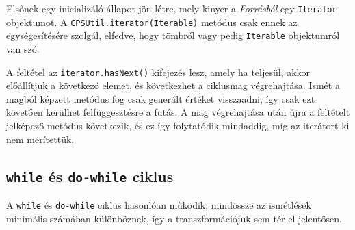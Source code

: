 Elsőnek egy inicializáló állapot jön létre, mely kinyer a \textit{Forrásból} egy \texttt{Iterator} objektumot. A \texttt{CPSUtil.iterator(Iterable)} metódus csak ennek az egységesítésére szolgál, elfedve, hogy tömbről vagy pedig \texttt{Iterable} objektumról van szó. 

A feltétel az \texttt{iterator.hasNext()} kifejezés lesz, amely ha teljesül, akkor előállítjuk a következő elemet, és következhet a ciklusmag végrehajtása. Ismét a magból képzett metódus fog csak generált értéket visszaadni, így csak ezt követően kerülhet felfüggesztésre a futás. A mag végrehajtása után újra a feltételt jelképező metódus következik, és ez így folytatódik mindaddig, míg az iterátort ki nem merítettük.

\subsection{\texttt{while} és \texttt{do-while} ciklus}

A \texttt{while} és \texttt{do-while} ciklus hasonlóan működik, mindössze az ismétlések minimális számában különböznek, így a transzformációjuk sem tér el jelentősen.


